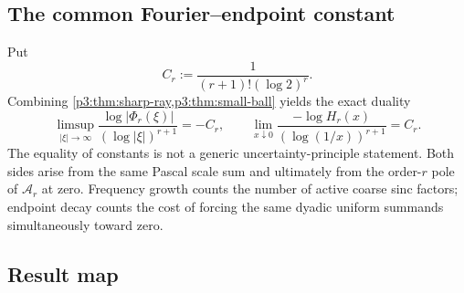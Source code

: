 \documentclass[11pt,oneside]{article}
\theoremstyle{definition}
\theoremstyle{remark}
\begin{document}
\subsection{The common Fourier--endpoint constant}

Put
\begin{equation}\label{p3:eq:Cr-common}
 C_r:=\frac1{(r+1)!(\log2)^r}.
\end{equation}
Combining \cref{p3:thm:sharp-ray,p3:thm:small-ball} yields the exact duality
\begin{equation}\label{p3:eq:fourier-endpoint-duality}
 \limsup_{|\xi|\to\infty}
 \frac{\log|\Phi_r(\xi)|}{(\log|\xi|)^{r+1}}
 =-C_r,
 \qquad
 \lim_{x\downarrow0}
 \frac{-\log H_r(x)}{(\log(1/x))^{r+1}}
 =C_r.
\end{equation}
The equality of constants is not a generic uncertainty-principle statement.  Both sides arise from the same Pascal scale sum and ultimately from the order-$r$ pole of $\mathcal A_r$ at zero.  Frequency growth counts the number of active coarse sinc factors; endpoint decay counts the cost of forcing the same dyadic uniform summands simultaneously toward zero.

\subsection{Result map}
\end{document}
